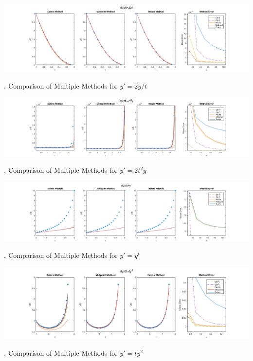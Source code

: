 \documentclass[11.5pt]{article}
\newcounter{graphics}
\begin{document}
\begin{center}
\includegraphics[width = 6in]{1st.png}\\
\begin{scriptsize}
{\bf {}.} Comparison of Multiple Methods for $y' = 2y/t$
\end{scriptsize}
\end{center}
\begin{center}
\includegraphics[width = 6in]{2nd.png}\\
\begin{scriptsize}
{\bf {}.} Comparison of Multiple Methods for $y' = 2t^2y$
\end{scriptsize}
\end{center}
\begin{center}
\includegraphics[width = 6in]{3rd.png}\\
\begin{scriptsize}
{\bf {}.} Comparison of Multiple Methods for $y' = y^t$
\end{scriptsize}
\end{center}
\begin{center}
\includegraphics[width = 6in]{4th.png}\\
\begin{scriptsize}
{\bf {}.} Comparison of Multiple Methods for $y' = ty^2$
\end{scriptsize}
\end{center}
\end{document}
